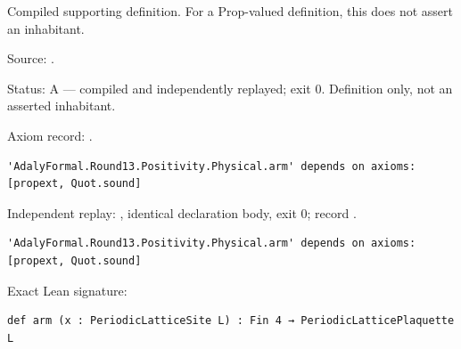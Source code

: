 \begin{definition}[bp-488]
\label{bp-488}
\uses{}
\leanok
Compiled supporting definition. For a Prop-valued definition, this does not assert an inhabitant.

\par Source: \texttt{}.
\par Status: A — compiled and independently replayed; exit 0. Definition only, not an asserted inhabitant.
\par Axiom record: \texttt{}.
\begin{verbatim}
'AdalyFormal.Round13.Positivity.Physical.arm' depends on axioms: [propext, Quot.sound]
\end{verbatim}
\par Independent replay: \texttt{}, identical declaration body, exit 0; record \texttt{}.
\begin{verbatim}
'AdalyFormal.Round13.Positivity.Physical.arm' depends on axioms: [propext, Quot.sound]
\end{verbatim}
\par Exact Lean signature:
\begin{verbatim}
def arm (x : PeriodicLatticeSite L) : Fin 4 → PeriodicLatticePlaquette L
\end{verbatim}
\end{definition}

